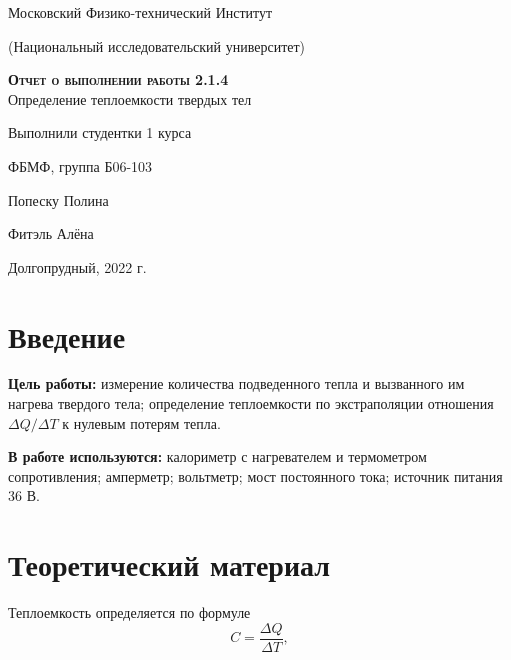 \documentclass[12pt,a4paper]{article}
\begin{document}
\begin{titlepage}
  \begin{center}
    \huge
    Московский Физико-технический Институт
    
    (Национальный исследовательский университет)
    \vspace{0.5cm}

   
    \vspace{0.25cm}
 
    \vfill
 
    \vfill

    \textsc{\bf{Отчет о выполнении работы 2.1.4}}\\[3mm]
    
    {\LARGE  Определение теплоемкости твердых тел}
  \bigskip
    \vfill
    
\end{center}
\vfill
\begin{flushright}

    Выполнили студентки 1 курса
    
    ФБМФ, группа Б06-103

    Попеску Полина
    
    
    Фитэль Алёна

\end{flushright}
\bigskip


\vfill

\begin{center}
  Долгопрудный, 2022 г.
\end{center}
\end{titlepage}

\section{Введение}

	\textbf{Цель работы:} измерение количества подведенного тепла и вызванного им нагрева твердого тела; определение теплоемкости по экстраполяции отношения $\Delta Q / \Delta T$ к нулевым потерям тепла.

	\textbf{В работе используются:} калориметр с нагревателем и термометром сопротивления; амперметр; вольтметр; мост постоянного тока; источник питания 36 В.

\section{Теоретический материал}


Теплоемкость определяется по формуле
\begin{equation}
	C = \frac{\Delta Q}{\Delta T},
	\label{eq:dQdT}
\end{equation}
\end{document}
